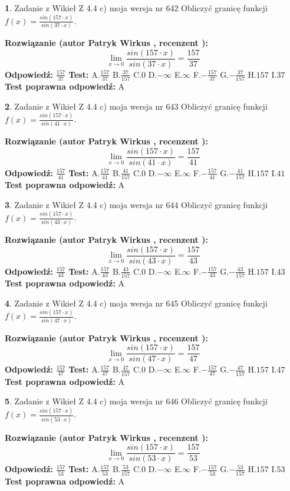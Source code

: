 \documentclass[12pt, a4paper]{article}
\theoremstyle{definition} %
\newtheorem{zad}{}
\newcommand{\zadStart}[1]{\begin{zad}#1\newline}
\newcommand{\zadStop}{\end{zad}}
\newcommand{\rozwStart}[2]{\noindent \textbf{Rozwiązanie (autor #1 , recenzent #2): }\newline}
\newcommand{\rozwStop}{\newline}
\newcommand{\odpStart}{\noindent \textbf{Odpowiedź:}\newline}
\newcommand{\odpStop}{\newline}
\newcommand{\testStart}{\noindent \textbf{Test:}\newline}
\newcommand{\testStop}{\newline}
\newcommand{\kluczStart}{\noindent \textbf{Test poprawna odpowiedź:}\newline}
\newcommand{\kluczStop}{\newline}
\begin{document}
\zadStart{Zadanie z Wikieł Z 4.4 c) moja wersja nr 642}
Obliczyć granicę funkcji $f(x)=\frac{sin(157\cdot x)}{sin(37\cdot x)}$.
\zadStop
\rozwStart{Patryk Wirkus}{}
$$\lim\limits_{x\to 0}\frac{sin(157\cdot x)}{sin(37\cdot x)}=
\frac{157}{37}$$
\rozwStop
\odpStart
$\frac{157}{37}$
\odpStop
\testStart
A.$\frac{157}{37}$
B.$\frac{37}{157}$
C.$0$
D.$-\infty$
E.$\infty$
F.$-\frac{157}{37}$
G.$-\frac{37}{157}$
H.$157$
I.$37$
\testStop
\kluczStart
A
\kluczStop



\zadStart{Zadanie z Wikieł Z 4.4 c) moja wersja nr 643}
Obliczyć granicę funkcji $f(x)=\frac{sin(157\cdot x)}{sin(41\cdot x)}$.
\zadStop
\rozwStart{Patryk Wirkus}{}
$$\lim\limits_{x\to 0}\frac{sin(157\cdot x)}{sin(41\cdot x)}=
\frac{157}{41}$$
\rozwStop
\odpStart
$\frac{157}{41}$
\odpStop
\testStart
A.$\frac{157}{41}$
B.$\frac{41}{157}$
C.$0$
D.$-\infty$
E.$\infty$
F.$-\frac{157}{41}$
G.$-\frac{41}{157}$
H.$157$
I.$41$
\testStop
\kluczStart
A
\kluczStop



\zadStart{Zadanie z Wikieł Z 4.4 c) moja wersja nr 644}
Obliczyć granicę funkcji $f(x)=\frac{sin(157\cdot x)}{sin(43\cdot x)}$.
\zadStop
\rozwStart{Patryk Wirkus}{}
$$\lim\limits_{x\to 0}\frac{sin(157\cdot x)}{sin(43\cdot x)}=
\frac{157}{43}$$
\rozwStop
\odpStart
$\frac{157}{43}$
\odpStop
\testStart
A.$\frac{157}{43}$
B.$\frac{43}{157}$
C.$0$
D.$-\infty$
E.$\infty$
F.$-\frac{157}{43}$
G.$-\frac{43}{157}$
H.$157$
I.$43$
\testStop
\kluczStart
A
\kluczStop



\zadStart{Zadanie z Wikieł Z 4.4 c) moja wersja nr 645}
Obliczyć granicę funkcji $f(x)=\frac{sin(157\cdot x)}{sin(47\cdot x)}$.
\zadStop
\rozwStart{Patryk Wirkus}{}
$$\lim\limits_{x\to 0}\frac{sin(157\cdot x)}{sin(47\cdot x)}=
\frac{157}{47}$$
\rozwStop
\odpStart
$\frac{157}{47}$
\odpStop
\testStart
A.$\frac{157}{47}$
B.$\frac{47}{157}$
C.$0$
D.$-\infty$
E.$\infty$
F.$-\frac{157}{47}$
G.$-\frac{47}{157}$
H.$157$
I.$47$
\testStop
\kluczStart
A
\kluczStop



\zadStart{Zadanie z Wikieł Z 4.4 c) moja wersja nr 646}
Obliczyć granicę funkcji $f(x)=\frac{sin(157\cdot x)}{sin(53\cdot x)}$.
\zadStop
\rozwStart{Patryk Wirkus}{}
$$\lim\limits_{x\to 0}\frac{sin(157\cdot x)}{sin(53\cdot x)}=
\frac{157}{53}$$
\rozwStop
\odpStart
$\frac{157}{53}$
\odpStop
\testStart
A.$\frac{157}{53}$
B.$\frac{53}{157}$
C.$0$
D.$-\infty$
E.$\infty$
F.$-\frac{157}{53}$
G.$-\frac{53}{157}$
H.$157$
I.$53$
\testStop
\kluczStart
A
\kluczStop
\end{document}
